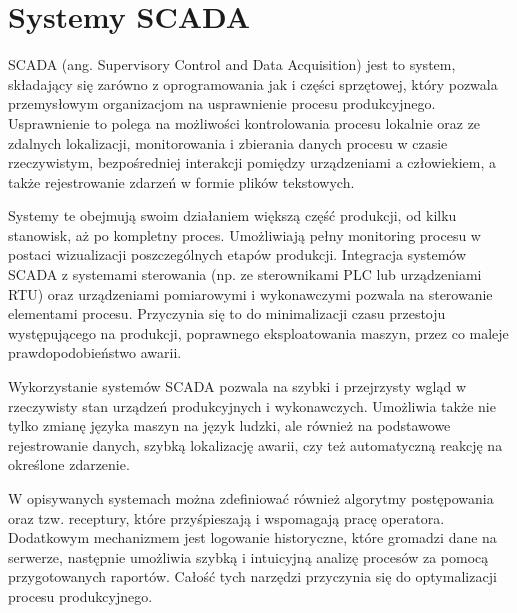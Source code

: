 

\section{Systemy SCADA}
\label{sec:SCADA}

SCADA (ang. Supervisory Control and Data Acquisition) jest to system, składający się zarówno z oprogramowania jak i części sprzętowej, który pozwala przemysłowym organizacjom na usprawnienie procesu produkcyjnego. Usprawnienie to polega na możliwości kontrolowania procesu lokalnie oraz ze zdalnych lokalizacji, monitorowania i zbierania danych procesu w czasie rzeczywistym, bezpośredniej interakcji pomiędzy urządzeniami a człowiekiem, a także rejestrowanie zdarzeń w formie plików tekstowych.

Systemy te obejmują swoim działaniem większą część produkcji, od kilku stanowisk, aż po kompletny proces. Umożliwiają pełny monitoring procesu w postaci wizualizacji poszczególnych etapów produkcji. Integracja systemów SCADA z systemami sterowania (np. ze sterownikami PLC lub urządzeniami RTU) oraz urządzeniami pomiarowymi i wykonawczymi pozwala na sterowanie elementami procesu. Przyczynia się to do minimalizacji czasu przestoju występującego na produkcji, poprawnego eksploatowania maszyn, przez co maleje prawdopodobieństwo awarii.


Wykorzystanie systemów SCADA pozwala na szybki i przejrzysty wgląd w rzeczywisty stan urządzeń produkcyjnych i wykonawczych. Umożliwia także nie tylko zmianę języka maszyn na język ludzki, ale również na podstawowe rejestrowanie danych, szybką lokalizację awarii, czy też automatyczną reakcję na określone zdarzenie. 

W opisywanych systemach można zdefiniować również algorytmy postępowania oraz tzw. receptury, które przyśpieszają i wspomagają pracę operatora. Dodatkowym mechanizmem jest logowanie historyczne, które gromadzi dane na serwerze, następnie umożliwia szybką i intuicyjną analizę procesów za pomocą przygotowanych raportów. Całość tych narzędzi przyczynia się do optymalizacji procesu produkcyjnego.  



